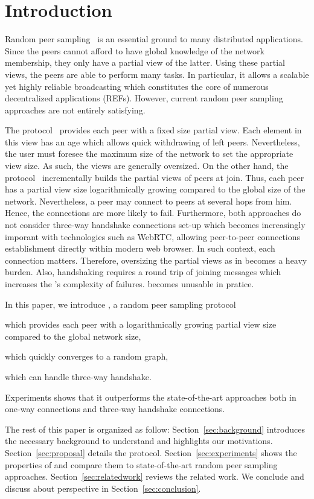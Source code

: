 
\section{Introduction}
Random peer sampling~\cite{jelasity2004peer} is an essential ground to many
distributed applications. Since the peers cannot afford to have global
knowledge of the network membership, they only have a partial view of the
latter. Using these partial views, the peers are able to perform many tasks. In
particular, it allows a scalable yet highly reliable broadcasting which
constitutes the core of numerous decentralized applications (REFs). However,
current random peer sampling approaches are not entirely satisfying.

The \CYCLON{} protocol~\cite{voulgaris2005cyclon} provides each peer with a
fixed size partial view.  Each element in this view has an age which allows
quick withdrawing of left peers. Nevertheless, the user must foresee the
maximum size of the network to set the appropriate view size. As such, the
views are generally oversized. On the other hand, the \SCAMP{}
protocol~\cite{ganesh2001scamp,ganesh2003peer} incrementally builds the partial
views of peers at join. Thus, each peer has a partial view size logarithmically
growing compared to the global size of the network. Nevertheless, a peer may
connect to peers at several hops from him. Hence, the connections are more
likely to fail.  Furthermore, both approaches do not consider three-way
handshake connections set-up which becomes increasingly imporant with
technologies such as WebRTC, allowing peer-to-peer connections establishment
directly within modern web browser. In such context, each connection
matters. Therefore, oversizing the partial views as in \CYCLON{} becomes a
heavy burden. Also, handshaking requires a round trip of joining messages which
increases the \SCAMP{}'s complexity of failures. \SCAMP{} becomes unusable in
pratice.

In this paper, we introduce \SCAMPLON{}, a random peer sampling protocol
\begin{inparaenum}[(i)]
\item which provides each peer with a logarithmically growing partial view size
  compared to the global network size,
\item which quickly converges to a random graph,
\item which can handle three-way handshake.
\end{inparaenum}
Experiments shows that it outperforms the state-of-the-art approaches both in
one-way connections and three-way handshake connections.

The rest of this paper is organized as follow: Section~\ref{sec:background}
introduces the necessary background to understand \SCAMPLON{} and highlights
our motivations. Section~\ref{sec:proposal} details the \SCAMPLON{} protocol.
Section~\ref{sec:experiments} shows the properties of \SCAMPLON{} and compare
them to state-of-the-art random peer sampling
approaches. Section~\ref{sec:relatedwork} reviews the related work. We conclude
and discuss about perspective in Section~\ref{sec:conclusion}.

